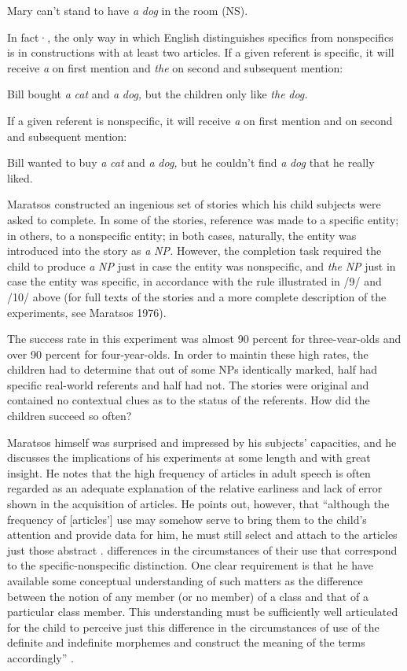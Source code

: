 \ea\label{ex:8}
 Mary can't stand to have \textit{a} \textit{dog} in the room (NS). 
\z

In fact·, the only way in which English distinguishes specifics from nonspecifics is in constructions with at least two articles. If a given referent is specific, it will receive \textit{a} on first mention and \textit{the} on second and subsequent mention:

\ea\label{ex:9}
 Bill bought \textit{a} \textit{cat} and \textit{a} \textit{dog,} but the children only like \textit{the} \textit{dog.}
\glt
\z

If a given referent is nonspecific, it will receive \textit{a} on first mention and on second and subsequent mention:

\ea\label{ex:10}
 Bill wanted to buy \textit{a} \textit{cat} and \textit{a} \textit{dog,} but he couldn't find \textit{a} \textit{dog} that he really liked.
\z



Maratsos constructed an ingenious set of stories which his child subjects were asked to complete. In some of the stories, reference was made to a specific entity; in others, to a nonspecific entity; in both cases, naturally, the entity was introduced into the story as \textit{a} \textit{N}\textit{P.} However, the completion task required the child to produce \textit{a} \textit{NP} just in case the entity was nonspecific, and \textit{the} \textit{NP} just in case the entity was specific, in accordance with the rule illustrated in /9/ and /10/ above (for full texts of the stories and a more complete description of the experiments, see Maratsos 1976).

The success rate in this experiment was almost 90 percent for three-vear-olds and over 90 percent for four-year-olds. In order to maintin these high rates, the children had to determine that out of some NPs identically marked, half had specific real-world referents and half had not. The stories were original and contained no contextual clues as to the status of the referents. How did the children succeed so often?

Maratsos himself was surprised and impressed by his subjects' capacities, and he discusses the implications of his experiments at
some length and with great insight. He notes that the high frequency
of articles in adult speech is often regarded as an adequate explanation
of the relative earliness and lack of error shown in the acquisition of articles. He points out, however, that ``although the frequency of [articles'] use may somehow serve to bring them to the child's atten\-tion and provide data for him, he must still select and attach to the articles just those abstract . differences in the circumstances of their use that correspond to the specific-nonspecific distinction. One clear requirement is that he have available some conceptual understanding of such matters as the difference between the notion of any member (or no member) of a class and that of a particular class member. This understanding must be sufficiently well articulated for the child to perceive just this difference in the circumstances of use of the definite and indefinite morphemes and construct the meaning of the terms accordingly'' \citep[453]{Maratsos1974}.

